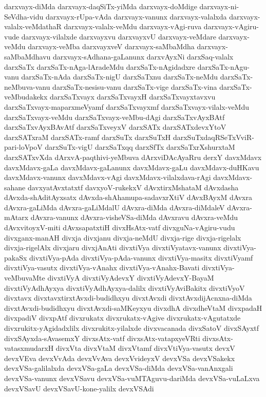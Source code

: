 {darxvayx-diMda
darxvayx-daqSiTx-yiMda
darxvayx-doMdige
darxvayx-ni-SeVdha-vidu
darxvayx-rUpa-vAda
darxvayx-vanunx
darxvayx-valalxda
darxvayx-valalx-veMdathaR
darxvayx-valalx-veMdu
darxvayx-vAgi-ruva
darxvayx-vAgiru-vude
darxvayx-vilalxde
darxvayxvu
darxvayxvU
darxvayx-veMdare
darxvayx-veMdu
darxvayx-veMba
darxvayxveV
darxvayx-saMbaMdha
darxvayx-saMbaMdhavu
darxvayx-sAdhana-gaLanunx
darxvAyxNi
darxSaq-valalx
darxSaTx
darxSaTx-nAga-lAradeMdu
darxSaTx-nAgidadxre
darxSaTx-nAgu-vanu
darxSaTx-nAda
darxSaTx-nigU
darxSaTxnu
darxSaTx-neMdu
darxSaTx-neMbuva-vanu
darxSaTx-nesisu-vanu
darxSaTx-vige
darxSaTx-vina
darxSaTx-veMbudakekx
darxSaTxvayx
darxSaTxvayxH
darxSaTxvayxtavxvu
darxSaTxvayx-maparxmeVyamf
darxSaTxvayxmf
darxSaTxvayx-vilalx-veMdu
darxSaTxvayx-veMdu
darxSaTxvayx-veMbu-dAgi
darxSaTxvAyxBAtf
darxSaTxvAyxBAvAtf
darxSaTxveyxV
darxSATx
darxSATxdevxYtoV
darxSATxraM
darxSATx-ramf
darxSuTx
darxSuTxH
darxSuTxdaqRSeTxVviR-pari-loVpoV
darxSuTx-vigU
darxSaTxqq
darxSfTx
darxSaTxrXshurxtaM
darxSATxvXda
dArxvA-paqthivi-yeMbuva
dArxviDAcAyaRru
derxY
davxMdavx
davxMdavx-gaLa
davxMdavx-gaLanunx
davxMdavx-gaLu
davxMdavx-duHKavu
davxMdavx-vanunx
davxMdavx-vAgi
davxMdavx-vilalxdava-rAgi
davxMdavx-sahane
davxyatAvxtatxtf
davxyoV-rukekxV
dAvxtirxMshataM
dAvxdasha
dAvxda-shAditAyxsatx
dAvxda-shAhamupa-sadavxrXtiV
dAvxBAyxM
dAvxra
dAvxra-gaLiMda
dAvxra-gaLiMdalU
dAvxra-diMda
dAvxra-diMdaleV
dAvxra-mAtarx
dAvxra-vanunx
dAvxra-visheVSa-diMda
dAvxravu
dAvxra-veMdu
dAvxvitoyxV-miti
dAvxsapatxtiH
divxHsAtx-vatf
divxguNa-vAgiru-vudu
divxganx-manAH
divxja
divxjanu
divxja-neMdU
divxja-rige
divxja-rigelalx
divxja-rigelAlx
divxjaru
divxjAnAti
divxtiVya
divxtiVyatavx-vanunx
divxtiVya-pakaSx
divxtiVya-pAda
divxtiVya-pAda-vanunx
divxtiVya-masitx
divxtiVyamf
divxtiVya-vasutx
divxtiVya-vAnahx
divxtiVya-vAnahx-Bavati
divxtiVya-veMbuvaMte
divxtiVyA
divxtiVyAdevxY
divxtiVyAdevxY-BayaM
divxtiVyAdhAyxya
divxtiVyAdhAyxya-dalilx
divxtiVyAviBakitx
divxtiVyoV
divxtavx
divxtavxtirxtAvxdi-budidhxyu
divxtAvxdi
divxtAvxdijAcnxna-diMda
divxtAvxdi-budidhxyu
divxtAvxdi-saMKeyxyu
divxdhA
divxdheVtaM
divxpadaH
divxpadiV
divxpAtf
divxrukatx
divxrukatx-vAgive
divxrukatx-vAgutatxde
divxrukitx-yAgidadxlilx
divxrukitx-yilalxde
divxvacanada
divxSatoV
divxSAyxtf
divxSAyxda-sAvasemxY
divxsAtx-vatf
divxsAtx-vatapxyeVRti
divxsAtx-vatasxmudarxH
divxVta
divxVtaM
divxVtamf
divxVtiVya-vasutx
devxV
devxVEva
devxVvAda
devxVvAva
devxVvideyxV
devxVSa
devxVSakekx
devxVSa-galilalxda
devxVSa-gaLa
devxVSa-diMda
devxVSa-vanAnxgali
devxVSa-vanunx
devxVSavu
devxVSa-vuMTAguvu-dariMda
devxVSa-vuLaLxva
devxVSavU
devxVSavU-kone-yalilx
devxVSAdi
}
